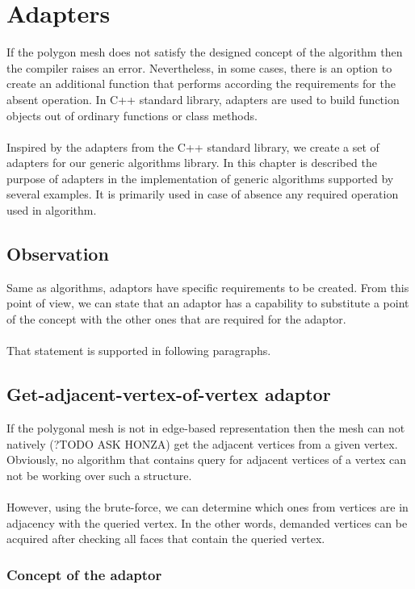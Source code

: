 \chapter{Adapters}

If the polygon mesh does not satisfy the designed concept of the algorithm then the compiler
raises an error. Nevertheless, in some cases, there is an option to create an additional function
that performs according the requirements for the absent operation.
In C++ standard library, adapters are used to build function objects out of ordinary
functions or class methods\cite{Simonis2000}.\\
\\
Inspired by the adapters from the C++ standard library, we create a set of adapters
for our generic algorithms library.
In this chapter is described the purpose of adapters in the implementation of generic algorithms
supported by several examples. It is primarily used in case of absence any required operation
used in algorithm.

\section{Observation}

Same as algorithms, adaptors have specific requirements to be created. From this point of view,
we can state that an adaptor has a capability to substitute a point of the concept with
the other ones that are required for the adaptor.\\
\\
That statement is supported in following paragraphs.

\section{Get-adjacent-vertex-of-vertex adaptor}

If the polygonal mesh is not in edge-based representation then the mesh can not natively (?TODO ASK HONZA)
get the adjacent vertices from a given vertex. Obviously, no algorithm that contains query for
adjacent vertices of a vertex can not be working over such a structure.\\
\\
However, using the brute-force, we can determine which ones from vertices are in adjacency with
the queried vertex. In the other words, demanded vertices can be acquired after checking all
faces that contain the queried vertex.

\subsection{Concept of the adaptor}

